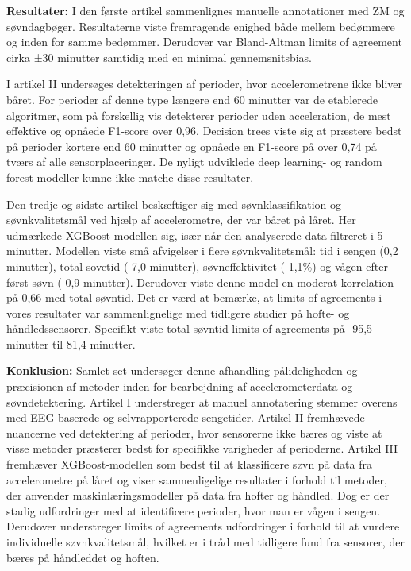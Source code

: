 \documentclass[
  10pt,
]{scrbook}
\let\originaltextbf\textbf
\renewcommand{\textbf}[1]{\textcolor{color1}{\originaltextbf{#1}}}
\begin{document}
\textbf{Resultater:} I den første artikel sammenlignes manuelle
annotationer med ZM og søvndagbøger. Resultaterne viste fremragende
enighed både mellem bedømmere og inden for samme bedømmer. Derudover var
Bland-Altman limits of agreement cirka ±30 minutter samtidig med en
minimal gennemsnitsbias.

I artikel II undersøges detekteringen af perioder, hvor accelerometrene
ikke bliver båret. For perioder af denne type længere end 60 minutter
var de etablerede algoritmer, som på forskellig vis detekterer perioder
uden acceleration, de mest effektive og opnåede F1-score over 0,96.
Decision trees viste sig at præstere bedst på perioder kortere end 60
minutter og opnåede en F1-score på over 0,74 på tværs af alle
sensorplaceringer. De nyligt udviklede deep learning- og random
forest-modeller kunne ikke matche disse resultater.

Den tredje og sidste artikel beskæftiger sig med søvnklassifikation og
søvnkvalitetsmål ved hjælp af accelerometre, der var båret på låret. Her
udmærkede XGBoost-modellen sig, især når den analyserede data filtreret
i 5 minutter. Modellen viste små afvigelser i flere søvnkvalitetsmål:
tid i sengen (0,2 minutter), total sovetid (-7,0 minutter),
søvneffektivitet (-1,1\%) og vågen efter først søvn (-0,9 minutter).
Derudover viste denne model en moderat korrelation på 0,66 med total
søvntid. Det er værd at bemærke, at limits of agreements i vores
resultater var sammenlignelige med tidligere studier på hofte- og
håndledssensorer. Specifikt viste total søvntid limits of agreements på
-95,5 minutter til 81,4 minutter.

\textbf{Konklusion:} Samlet set undersøger denne afhandling
pålideligheden og præcisionen af metoder inden for bearbejdning af
accelerometerdata og søvndetektering. Artikel I understreger at manuel
annotatering stemmer overens med EEG-baserede og selvrapporterede
sengetider. Artikel II fremhævede nuancerne ved detektering af perioder,
hvor sensorerne ikke bæres og viste at visse metoder præsterer bedst for
specifikke varigheder af perioderne. Artikel III fremhæver
XGBoost-modellen som bedst til at klassificere søvn på data fra
accelerometre på låret og viser sammenligelige resultater i forhold til
metoder, der anvender maskinlæringsmodeller på data fra hofter og
håndled. Dog er der stadig udfordringer med at identificere perioder,
hvor man er vågen i sengen. Derudover understreger limits of agreements
udfordringer i forhold til at vurdere individuelle søvnkvalitetsmål,
hvilket er i tråd med tidligere fund fra sensorer, der bæres på
håndleddet og hoften.
\end{document}
